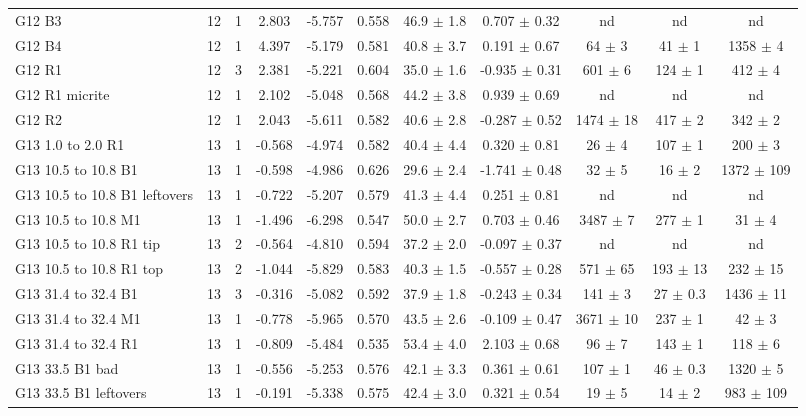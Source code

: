 \documentclass{article}
\begin{document}
\begin{sidewaystable}[htbp]
\begin{tabular}{ | l | c | c | c | c | c | c | c | c | c | c | }
G12 B3 & 12 & 1 & 2.803 & -5.757 & 0.558 & 46.9 $\pm$ 1.8 & 0.707 $\pm$ 0.32 &  nd  &  nd  &  nd  \\
G12 B4 & 12 & 1 & 4.397 & -5.179 & 0.581 & 40.8 $\pm$ 3.7 & 0.191 $\pm$ 0.67 & 64 $\pm$ 3 & 41 $\pm$ 1 & 1358 $\pm$ 4 \\
G12 R1 & 12 & 3 & 2.381 & -5.221 & 0.604 & 35.0 $\pm$ 1.6 & -0.935 $\pm$ 0.31 & 601 $\pm$ 6 & 124 $\pm$ 1 & 412 $\pm$ 4 \\
G12 R1 micrite & 12 & 1 & 2.102 & -5.048 & 0.568 & 44.2 $\pm$ 3.8 & 0.939 $\pm$ 0.69 &  nd  &  nd  &  nd  \\
G12 R2 & 12 & 1 & 2.043 & -5.611 & 0.582 & 40.6 $\pm$ 2.8 & -0.287 $\pm$ 0.52 & 1474 $\pm$ 18 & 417 $\pm$ 2 & 342 $\pm$ 2 \\
G13 1.0 to 2.0 R1 & 13 & 1 & -0.568 & -4.974 & 0.582 & 40.4 $\pm$ 4.4 & 0.320 $\pm$ 0.81 & 26 $\pm$ 4 & 107 $\pm$ 1 & 200 $\pm$ 3 \\
G13 10.5 to 10.8 B1 & 13 & 1 & -0.598 & -4.986 & 0.626 & 29.6 $\pm$ 2.4 & -1.741 $\pm$ 0.48 & 32 $\pm$ 5 & 16 $\pm$ 2 & 1372 $\pm$ 109 \\
G13 10.5 to 10.8 B1 leftovers & 13 & 1 & -0.722 & -5.207 & 0.579 & 41.3 $\pm$ 4.4 & 0.251 $\pm$ 0.81 &  nd  &  nd  &  nd  \\
G13 10.5 to 10.8 M1 & 13 & 1 & -1.496 & -6.298 & 0.547 & 50.0 $\pm$ 2.7 & 0.703 $\pm$ 0.46 & 3487 $\pm$ 7 & 277 $\pm$ 1 & 31 $\pm$ 4 \\
G13 10.5 to 10.8 R1 tip & 13 & 2 & -0.564 & -4.810 & 0.594 & 37.2 $\pm$ 2.0 & -0.097 $\pm$ 0.37 &  nd  &  nd  &  nd  \\
G13 10.5 to 10.8 R1 top & 13 & 2 & -1.044 & -5.829 & 0.583 & 40.3 $\pm$ 1.5 & -0.557 $\pm$ 0.28 & 571 $\pm$ 65 & 193 $\pm$ 13 & 232 $\pm$ 15 \\
G13 31.4 to 32.4 B1 & 13 & 3 & -0.316 & -5.082 & 0.592 & 37.9 $\pm$ 1.8 & -0.243 $\pm$ 0.34 & 141 $\pm$ 3 & 27 $\pm$ 0.3 & 1436 $\pm$ 11 \\
G13 31.4 to 32.4 M1 & 13 & 1 & -0.778 & -5.965 & 0.570 & 43.5 $\pm$ 2.6 & -0.109 $\pm$ 0.47 & 3671 $\pm$ 10 & 237 $\pm$ 1 & 42 $\pm$ 3 \\
G13 31.4 to 32.4 R1 & 13 & 1 & -0.809 & -5.484 & 0.535 & 53.4 $\pm$ 4.0 & 2.103 $\pm$ 0.68 & 96 $\pm$ 7 & 143 $\pm$ 1 & 118 $\pm$ 6 \\
G13 33.5 B1 bad & 13 & 1 & -0.556 & -5.253 & 0.576 & 42.1 $\pm$ 3.3 & 0.361 $\pm$ 0.61 & 107 $\pm$ 1 & 46 $\pm$ 0.3 & 1320 $\pm$ 5 \\
G13 33.5 B1 leftovers & 13 & 1 & -0.191 & -5.338 & 0.575 & 42.4 $\pm$ 3.0 & 0.321 $\pm$ 0.54 & 19 $\pm$ 5 & 14 $\pm$ 2 & 983 $\pm$ 109 \\

\end{tabular}
\end{sidewaystable}
\end{document}

